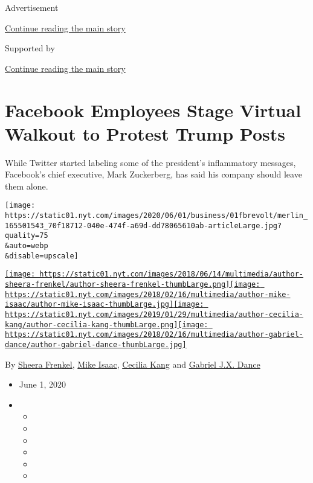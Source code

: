 Advertisement

\protect\hyperlink{after-top}{Continue reading the main story}

Supported by

\protect\hyperlink{after-sponsor}{Continue reading the main story}

\hypertarget{facebook-employees-stage-virtual-walkout-to-protest-trump-posts}{%
\section{Facebook Employees Stage Virtual Walkout to Protest Trump
Posts}\label{facebook-employees-stage-virtual-walkout-to-protest-trump-posts}}

While Twitter started labeling some of the president's inflammatory
messages, Facebook's chief executive, Mark Zuckerberg, has said his
company should leave them alone.

\texttt{[image: https://static01.nyt.com/images/2020/06/01/business/01fbrevolt/merlin\_165501543\_70f18712-040e-474f-a69d-dd78065610ab-articleLarge.jpg?quality=75\\\&auto=webp\\\&disable=upscale]}

\href{https://www.nytimes.com/by/sheera-frenkel}{\texttt{[image: https://static01.nyt.com/images/2018/06/14/multimedia/author-sheera-frenkel/author-sheera-frenkel-thumbLarge.png]}}\href{https://www.nytimes.com/by/mike-isaac}{\texttt{[image: https://static01.nyt.com/images/2018/02/16/multimedia/author-mike-isaac/author-mike-isaac-thumbLarge.jpg]}}\href{https://www.nytimes.com/by/cecilia-kang}{\texttt{[image: https://static01.nyt.com/images/2019/01/29/multimedia/author-cecilia-kang/author-cecilia-kang-thumbLarge.png]}}\href{https://www.nytimes.com/by/gabriel-dance}{\texttt{[image: https://static01.nyt.com/images/2018/02/16/multimedia/author-gabriel-dance/author-gabriel-dance-thumbLarge.jpg]}}

By \href{https://www.nytimes.com/by/sheera-frenkel}{Sheera Frenkel},
\href{https://www.nytimes.com/by/mike-isaac}{Mike Isaac},
\href{https://www.nytimes.com/by/cecilia-kang}{Cecilia Kang} and
\href{https://www.nytimes.com/by/gabriel-dance}{Gabriel J.X. Dance}

\begin{itemize}
\item
  June 1, 2020
\item
  \begin{itemize}
  \item
  \item
  \item
  \item
  \item
  \item
  \end{itemize}
\end{itemize}

